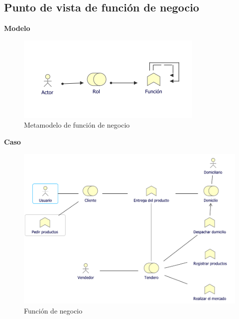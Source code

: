 	\subsection{Punto de vista de función de negocio}
	{ 
		
		\textbf{Modelo}\\
		\begin{figure}[H]
			\centering
			\includegraphics[width=0.8\linewidth]{development/funcion.png}
			\caption{Metamodelo de función de negocio}
		\end{figure}
		
		\textbf{Caso}\\
		
		\begin{figure}[H]
			\centering
			\includegraphics[width=0.8\linewidth]{development/funcion.pdf}
			\caption{Función de negocio}
		\end{figure}
	}
	
